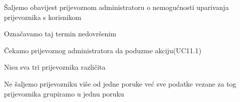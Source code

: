 \begin{packed_item}
\begin{packed_item}
\begin{packed_enum}
								\item Šaljemo obavijest prijevoznom administratoru o nemogućnosti uparivanja prijevoznika s korisnikom
								\item Označavamo taj termin nedovršenim
								\item Čekamo prijevoznog administratora da poduzme akciju(UC11.1)
								
							\end{packed_enum}
							
							\item[4.a] Nisu sva tri prijevoznika različita
							\item[] \begin{packed_enum}
								
								\item Ne šaljemo prijevozniku više od jedne poruke već sve podatke vezane za tog prijevoznika grupiramo u jednu poruku
								
							\end{packed_enum}
							
						\end{packed_item}
					\end{packed_item}
					
					
